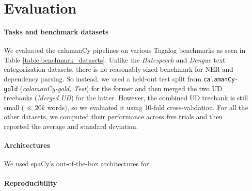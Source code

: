 \documentclass[11pt]{article}
\begin{document}
\section{Evaluation}

\paragraph*{Tasks and benchmark datasets} 
We evaluated the calamanCy pipelines on various Tagalog benchmarks as seen in Table \ref{table:benchmark_datasets}.
Unlike the \textit{Hatespeech} and \textit{Dengue} text categorization datasets, there is no reasonably-sized benchmark for NER and dependency parsing.
So instead, we used a held-out test split from \texttt{calamanCy-gold} (\textit{calamanCy-gold, Test}) for the former and then merged the two UD treebanks (\textit{Merged UD}) for the latter. 
However, the combined UD treebank is still small ($\ll 20k$ words), so we evaluated it using 10-fold cross-validation.
For all the other datasets, we computed their performance across five trials and then reported the average and standard deviation.


\paragraph*{Architectures}

We used spaCy's out-of-the-box architectures for %


\paragraph*{Reproducibility}
\end{document}
